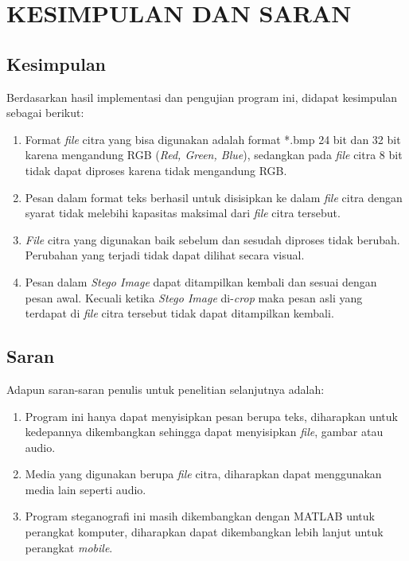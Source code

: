 
\chapter{KESIMPULAN DAN SARAN}

\section{Kesimpulan}
Berdasarkan hasil implementasi dan pengujian program ini, didapat kesimpulan sebagai berikut:

\begin{enumerate}
	\item Format \emph{file} citra yang bisa digunakan adalah format *.bmp 24 bit dan 32 bit karena mengandung RGB (\emph{Red, Green, Blue}), sedangkan pada \emph{file} citra 8 bit tidak dapat diproses karena tidak mengandung RGB.
	
	\item Pesan dalam format teks berhasil untuk disisipkan ke dalam \emph{file} citra dengan syarat tidak melebihi kapasitas maksimal dari \emph{file} citra tersebut.
	
	\item \emph{File} citra yang digunakan baik sebelum dan sesudah diproses tidak berubah. Perubahan yang terjadi tidak dapat dilihat secara visual.
	
	\item Pesan dalam \emph{Stego Image} dapat ditampilkan kembali dan sesuai dengan pesan awal. Kecuali ketika \emph{Stego Image} di-\emph{crop} maka pesan asli yang terdapat di \emph{file} citra tersebut tidak dapat ditampilkan kembali.

\end{enumerate}


\section{Saran}
Adapun saran-saran penulis untuk penelitian selanjutnya adalah:
\begin{enumerate}
	\item Program ini hanya dapat menyisipkan pesan berupa teks, diharapkan untuk kedepannya dikembangkan sehingga dapat menyisipkan \emph{file}, gambar atau audio.
	
	\item Media yang digunakan berupa \emph{file} citra, diharapkan dapat menggunakan media lain seperti audio.
	
	\item Program steganografi ini masih dikembangkan dengan MATLAB untuk perangkat komputer, diharapkan dapat dikembangkan lebih lanjut untuk perangkat \emph{mobile}. 
	
\end{enumerate}


\begin{comment}

\end{comment}